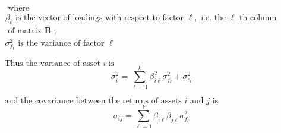 \documentclass[11pt]{article}
\begin{document}
\(\begin{array}{l}{\text { where }} \\ {\beta_{\ell} \text { is the vector of loadings with respect to factor } \ell, \text { i.e. the } \ell \text { th column }} \\ {\text { of matrix } \boldsymbol{B} \text { , }} \\ {\sigma_{f_{\ell}}^{2} \text { is the variance of factor } \ell}\end{array}\)

\(\text { Thus the variance of asset } i \text { is }\)
\[\sigma_{i}^{2}=\sum_{\ell=1}^{k} \beta_{i \ell}^{2} \sigma_{f_{\ell}}^{2}+\sigma_{\epsilon_{i}}^{2} \]

\(\text { and the covariance between the returns of assets } i \text { and } j \text { is }\)
\[ \sigma_{i j}=\sum_{\ell=1}^{k} \beta_{i \ell} \beta_{j \ell} \sigma_{f_{\ell}}^{2}\]
\end{document}
